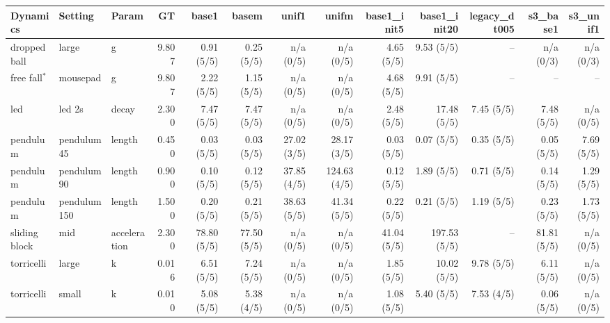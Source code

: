 \begin{tabular}{lll r r r r r r r r r r}
\toprule
Dynamics & Setting & Param & GT & base1 & basem & unif1 & unifm & base1_init5 & base1_init20 & legacy_dt005 & s3_base1 & s3_unif1 \\
\midrule
dropped ball & large & g & 9.807 & 0.91 (5/5) & 0.25 (5/5) & n/a (0/5) & n/a (0/5) & 4.65 (5/5) & 9.53 (5/5) & -- & n/a (0/3) & n/a (0/3) \\
free fall$^\ast$ & mousepad & g & 9.807 & 2.22 (5/5) & 1.15 (5/5) & n/a (0/5) & n/a (0/5) & 4.68 (5/5) & 9.91 (5/5) & -- & -- & -- \\
led & led 2s & decay & 2.300 & 7.47 (5/5) & 7.47 (5/5) & n/a (0/5) & n/a (0/5) & 2.48 (5/5) & 17.48 (5/5) & 7.45 (5/5) & 7.48 (5/5) & n/a (0/5) \\
pendulum & pendulum 45 & length & 0.450 & 0.03 (5/5) & 0.03 (5/5) & 27.02 (3/5) & 28.17 (3/5) & 0.03 (5/5) & 0.07 (5/5) & 0.35 (5/5) & 0.05 (5/5) & 7.69 (5/5) \\
pendulum & pendulum 90 & length & 0.900 & 0.10 (5/5) & 0.12 (5/5) & 37.85 (4/5) & 124.63 (4/5) & 0.12 (5/5) & 1.89 (5/5) & 0.71 (5/5) & 0.14 (5/5) & 1.29 (5/5) \\
pendulum & pendulum 150 & length & 1.500 & 0.20 (5/5) & 0.21 (5/5) & 38.63 (5/5) & 41.34 (5/5) & 0.22 (5/5) & 0.21 (5/5) & 1.19 (5/5) & 0.23 (5/5) & 1.73 (5/5) \\
sliding block & mid & acceleration & 2.300 & 78.80 (5/5) & 77.50 (5/5) & n/a (0/5) & n/a (0/5) & 41.04 (5/5) & 197.53 (5/5) & -- & 81.81 (5/5) & n/a (0/5) \\
torricelli & large & k & 0.016 & 6.51 (5/5) & 7.24 (5/5) & n/a (0/5) & n/a (0/5) & 1.85 (5/5) & 10.02 (5/5) & 9.78 (5/5) & 6.11 (5/5) & n/a (0/5) \\
torricelli & small & k & 0.010 & 5.08 (5/5) & 5.38 (4/5) & n/a (0/5) & n/a (0/5) & 1.08 (5/5) & 5.40 (5/5) & 7.53 (4/5) & 0.06 (5/5) & n/a (0/5) \\
\bottomrule
\end{tabular}
